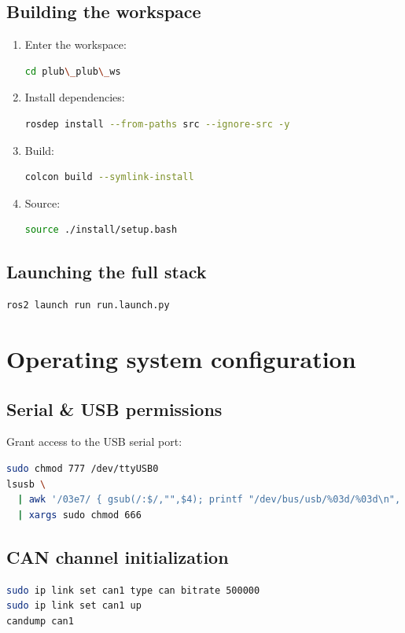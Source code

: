 \subsection{Building the workspace}
\begin{enumerate}
\item Enter the workspace:
\begin{lstlisting}[language=bash]
cd plub\_plub\_ws
\end{lstlisting}
\item Install dependencies:
\begin{lstlisting}[language=bash]
rosdep install --from-paths src --ignore-src -y
\end{lstlisting}
\item Build:
\begin{lstlisting}[language=bash]
colcon build --symlink-install
\end{lstlisting}
\item Source:
\begin{lstlisting}[language=bash]
source ./install/setup.bash
\end{lstlisting}
\end{enumerate}

\subsection{Launching the full stack}
\begin{lstlisting}[language=bash]
ros2 launch run run.launch.py
\end{lstlisting}

\section{Operating system configuration}

\subsection{Serial \& USB permissions}
Grant access to the USB serial port:
\begin{lstlisting}[language=bash]
sudo chmod 777 /dev/ttyUSB0
lsusb \
  | awk '/03e7/ { gsub(/:$/,"",$4); printf "/dev/bus/usb/%03d/%03d\n", $2, $4 }' \
  | xargs sudo chmod 666
\end{lstlisting}

\subsection{CAN channel initialization}
\begin{lstlisting}[language=bash]
sudo ip link set can1 type can bitrate 500000
sudo ip link set can1 up
candump can1
\end{lstlisting}

